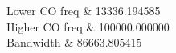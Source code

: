 Lower CO freq	&	13336.194585\\\hline
Higher CO freq	&	100000.000000\\\hline
Bandwidth	&	86663.805415\\\hline
